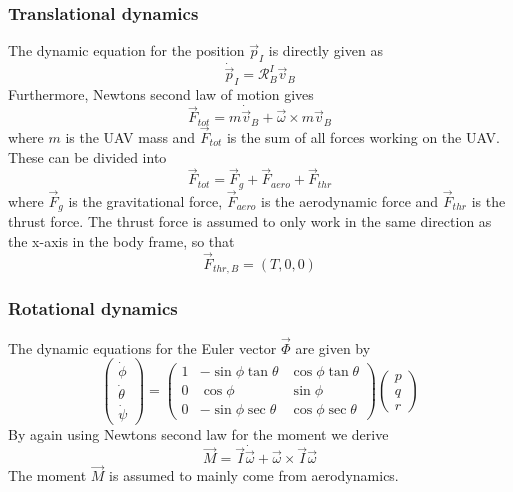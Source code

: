 \subsubsection{Translational dynamics}
The dynamic equation for the position $\vec{p}_I$ is directly given as
\begin{equation}\label{eq:dynamic_first}
    \dot{\vec{p}}_I=\mathcal{R}^I_B\vec{v}_B
\end{equation}
Furthermore, Newtons second law of motion gives 
\begin{equation}\label{eq:uav_force}
    \vec{F}_{tot}=m\dot{\vec{v}}_B + \vec{\omega}\times m\vec{v}_B 
\end{equation}
where $m$ is the UAV mass and $\vec{F}_{tot}$ is the sum of all forces working on the UAV.
These can be divided into
\begin{equation}
    \vec{F}_{tot}=\vec{F}_g+\vec{F}_{aero}+\vec{F}_{thr}
\end{equation}
where $\vec{F}_g$ is the gravitational force, $\vec{F}_{aero}$ is the aerodynamic force and
$\vec{F}_{thr}$ is the thrust force. The thrust force is assumed to only work in the same direction
as the x-axis in the body frame, so that
\begin{equation}
    \vec{F}_{thr, B}=(T, 0, 0)
\end{equation}
\subsubsection{Rotational dynamics}
The dynamic equations for the Euler vector $\vec{\Phi}$ are given by
\begin{equation}
    \begin{pmatrix}
        \dot{\phi} \\
        \dot{\theta} \\
        \dot{\psi}
    \end{pmatrix}
    =
    \begin{pmatrix}
        1 & -\sin\phi\tan\theta & \cos\phi\tan\theta \\
        0 & \cos\phi & \sin\phi \\
        0 & -\sin\phi\sec\theta & \cos\phi\sec\theta
    \end{pmatrix}
    \begin{pmatrix}
        p \\
        q \\
        r
    \end{pmatrix}
\end{equation}
By again using Newtons second law for the moment we derive
\begin{equation}
    \vec{M}=\vec{I}\dot{\vec{\omega}} + \vec{\omega}\times\vec{I}\vec{\omega}
\end{equation}
The moment $\vec{M}$ is assumed to mainly come from aerodynamics.
